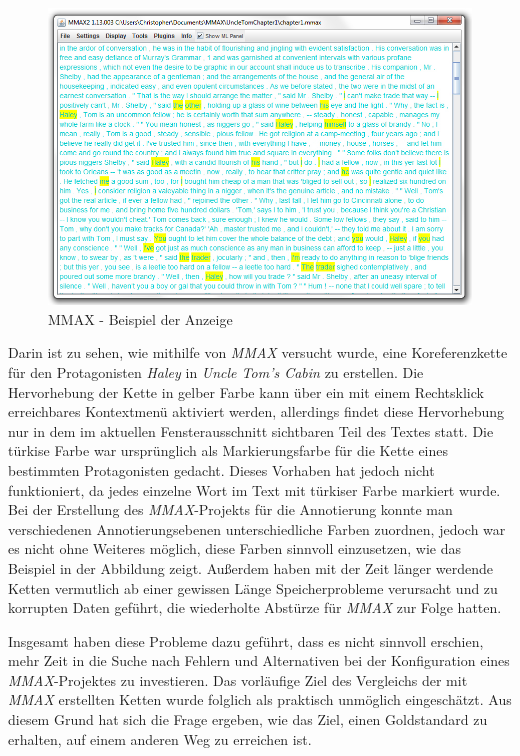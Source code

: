 \documentclass[a4paper,12pt,titlepage=true, ngerman]{scrartcl}
\begin{document}
\begin{figure}[ht]
\begin{center}
\includegraphics[width=15cm]{./img/cmich/cm_mmax.jpg}
\caption{MMAX - Beispiel der Anzeige}
\label{mmax:anzeige}
\end{center}
\end{figure}

Darin ist zu sehen, wie mithilfe von \emph{MMAX} versucht wurde, eine Koreferenzkette für den Protagonisten \emph{Haley} in \emph{Uncle Tom's Cabin} \autocite[]{chris_uncle} zu erstellen. Die Hervorhebung der Kette in gelber Farbe kann über ein mit einem Rechtsklick erreichbares Kontextmenü aktiviert werden, allerdings findet diese Hervorhebung nur in dem im aktuellen Fensterausschnitt sichtbaren Teil des Textes statt. Die türkise Farbe war ursprünglich als Markierungsfarbe für die Kette eines bestimmten Protagonisten gedacht. Dieses Vorhaben hat jedoch nicht funktioniert, da jedes einzelne Wort im Text mit türkiser Farbe markiert wurde. Bei der Erstellung des \emph{MMAX}-Projekts für die Annotierung konnte man verschiedenen Annotierungsebenen unterschiedliche Farben zuordnen, jedoch war es nicht ohne Weiteres möglich, diese Farben sinnvoll einzusetzen, wie das Beispiel in der Abbildung zeigt. Außerdem haben mit der Zeit länger werdende Ketten vermutlich ab einer gewissen Länge Speicherprobleme verursacht und zu korrupten Daten geführt, die wiederholte Abstürze für \emph{MMAX} zur Folge hatten. 

Insgesamt haben diese Probleme dazu geführt, dass es nicht sinnvoll erschien, mehr Zeit in die Suche nach Fehlern und Alternativen bei der Konfiguration eines \emph{MMAX}-Projektes zu investieren. Das vorläufige Ziel des Vergleichs der mit \emph{MMAX} erstellten Ketten wurde folglich als praktisch unmöglich eingeschätzt. Aus diesem Grund hat sich die Frage ergeben, wie das Ziel, einen Goldstandard zu erhalten, auf einem anderen Weg zu erreichen ist.
\end{document}
